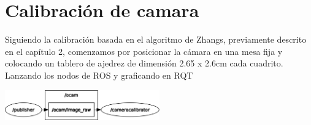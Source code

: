 \section{Calibración de camara}
Siguiendo la calibración basada en el algoritmo de Zhangs, previamente descrito en el capítulo 2,
comenzamos por posicionar la cámara en una mesa fija y colocando un tablero de ajedrez de dimensión
2.65 x 2.6cm cada cuadrito.\\ Lanzando los nodos de ROS y graficando en RQT
\begin{center}
	\includegraphics[width=0.5\textwidth]{Contenido/Cuerpo/Capitulo4/Fig11.eps}
	\label{Fig1}
\end{center}


